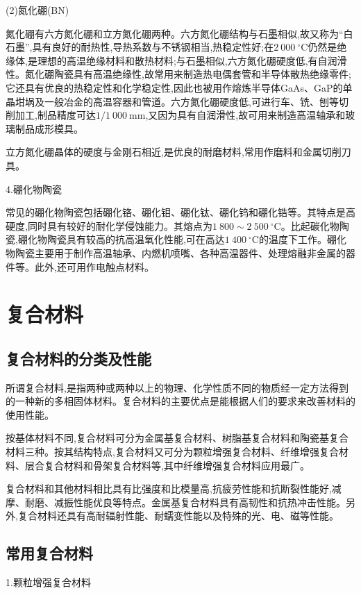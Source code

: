 \documentclass[UTF8]{ctexbook}
\newcommand{\◎}{\ensuremath{\bigcirc}}
\begin{document}
(2)氮化硼(BN)

氮化硼有六方氮化硼和立方氮化硼两种。六方氮化硼结构与石墨相似,故又称为“白石墨”,具有良好的耐热性,导热系数与不锈钢相当,热稳定性好;在$2~000~^\circ\mathrm{C}$仍然是绝缘体,是理想的高温绝缘材料和散热材料;与石墨相似,六方氮化硼硬度低,有自润滑性。氮化硼陶瓷具有高温绝缘性,故常用来制造热电偶套管和半导体散热绝缘零件;它还具有优良的热稳定性和化学稳定性,因此也被用作熔炼半导体GaAs、GaP的单晶坩埚及一般冶金的高温容器和管道。六方氮化硼硬度低,可进行车、铣、刨等切削加工,制品精度可达$1/1~000~\mathrm{mm}$,又因为具有自润滑性,故可用来制造高温轴承和玻璃制品成形模具。

立方氮化硼晶体的硬度与金刚石相近,是优良的耐磨材料,常用作磨料和金属切削刀具。

4.硼化物陶瓷

常见的硼化物陶瓷包括硼化铬、硼化钼、硼化钛、硼化钨和硼化锆等。其特点是高硬度,同时具有较好的耐化学侵蚀能力。其熔点为$1~800\sim2~500~^\circ\mathrm{C}$。比起碳化物陶瓷,硼化物陶瓷具有较高的抗高温氧化性能,可在高达$1~400~^\circ\mathrm{C}$的温度下工作。硼化物陶瓷主要用于制作高温轴承、内燃机喷嘴、各种高温器件、处理熔融非金属的器件等。此外,还可用作电触点材料。

\section{复合材料}

\subsection{复合材料的分类及性能}

所谓复合材料,是指两种或两种以上的物理、化学性质不同的物质经一定方法得到的一种新的多相固体材料。复合材料的主要优点是能根据人们的要求来改善材料的使用性能。

按基体材料不同,复合材料可分为金属基复合材料、树脂基复合材料和陶瓷基复合材料三种。按其结构特点,复合材料又可分为颗粒增强复合材料、纤维增强复合材料、层合复合材料和骨架复合材料等,其中纤维增强复合材料应用最广。

复合材料和其他材料相比具有比强度和比模量高,抗疲劳性能和抗断裂性能好,减摩、耐磨、减振性能优良等特点。金属基复合材料具有高韧性和抗热冲击性能。另外,复合材料还具有高耐辐射性能、耐蠕变性能以及特殊的光、电、磁等性能。

\subsection{常用复合材料}

1.颗粒增强复合材料
\end{document}
